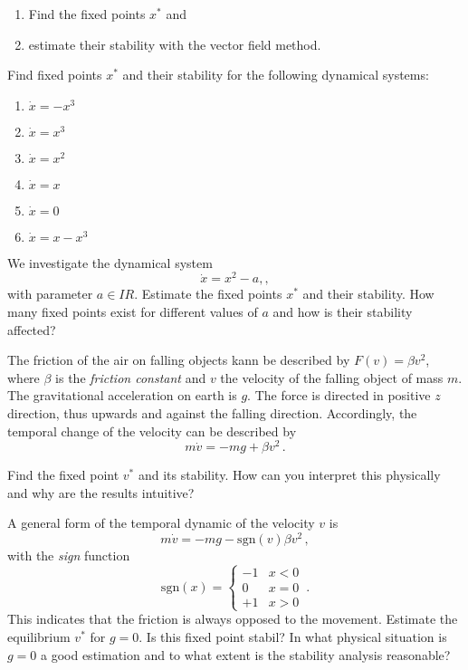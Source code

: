   \begin{enumerate}
      \item Find the fixed points $x^*$ and 
      \item estimate their stability with the vector field method.
  \end{enumerate}

  \subexercise
  
  Find fixed points $x^*$  and their stability for the following dynamical systems:
  \begin{enumerate}
      \item $\dot x = - x^3$
      \item $\dot x = x^3$
      \item $\dot x =x^2$
      \item $\dot x = x$
      \item $\dot x = 0$
      \item $\dot x = x-x^3$
  \end{enumerate}
  
  \subexercise[topic=Bifurcation]
  
  
  We investigate the dynamical system
  \begin{equation}
      \dot x = x^2 - a,,
  \end{equation}
  with parameter $a\in I\!\!R$.
  Estimate the fixed points $x^*$ and their stability. How many fixed points exist for different values of $a$ and how is their stability affected?

  \subexercise[topic=Newton-Friction]
  
  
  The friction of the air on falling objects kann be described by $F(v) = \beta v^2$, where $\beta$ is the \emph{friction constant} and $v$ the velocity of the falling object of mass $m$. The gravitational acceleration on earth is $g$. The force is directed in positive $z$ direction, thus upwards and against the falling direction. Accordingly, the temporal change of the velocity can be described by 
    \begin{equation}
      m\dot v = -mg+\beta v^2\,.
  \end{equation}
 
 Find the fixed point $v^*$ and its stability. How can you interpret this physically and why are the results intuitive? 
  
  
  A general form of the temporal dynamic of the velocity $v$ is 
  \begin{equation}
      m\dot v = -mg-\mathrm{sgn}(v)\beta v^2\,,
  \end{equation}
with the \emph{sign} function
  \begin{equation}
      \mathrm{sgn}(x)=\begin{cases}-1 & x<0\\
          0 & x=0\\
          +1 & x>0\end{cases}\,.
  \end{equation}
  This indicates that the friction is always opposed to the movement. Estimate the equilibrium  $v^*$ for $g=0$. Is this fixed point stabil? In what physical situation is $g=0$ a good estimation and to what extent is the stability analysis reasonable?
  
